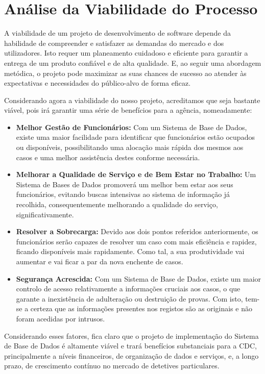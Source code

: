 \documentclass[a4paper,12pt]{scrreprt}
\begin{document}
    \section{Análise da Viabilidade do Processo}
        A viabilidade de um projeto de desenvolvimento de software depende da habilidade de compreender e satisfazer as
        demandas do mercado e dos utilizadores. Isto requer um planeamento cuidadoso e eficiente para garantir a
        entrega de um produto confiável e de alta qualidade. E, ao seguir uma abordagem metódica, o projeto pode
        maximizar as suas chances de sucesso ao atender às expectativas e necessidades do público-alvo de forma eficaz.
        \par Considerando agora a viabilidade do nosso projeto, acreditamos que seja bastante viável, pois irá garantir
        uma série de benefícios para a agência, nomeadamente:
        \begin{itemize}
            \item \textbf{Melhor Gestão de Funcionários:} Com um Sistema de Base de Dados, existe uma maior facilidade
                para identificar que funcionários estão ocupados ou disponíveis, possibilitando uma alocação mais
                rápida dos mesmos aos casos e uma melhor assistência destes conforme necessária.
            \item \textbf{Melhorar a Qualidade de Serviço e de Bem Estar no Trabalho:} Um Sistema de Bases de Dados
                promoverá um melhor bem estar aos seus funcionários, evitando buscas intensivas ao sistema de
                informação já recolhida, consequentemente melhorando a qualidade do serviço, significativamente.
            \item \textbf{Resolver a Sobrecarga:} Devido aos dois pontos referidos anteriormente, os funcionários
                serão capazes de resolver um caso com mais eficiência e rapidez, ficando disponíveis mais rapidamente.
                Como tal, a sua produtividade vai aumentar e vai ficar a par da nova enchente de casos.
            \item \textbf{Segurança Acrescida:} Com um Sistema de Base de Dados, existe um maior controlo de acesso
                relativamente a informações cruciais aos casos, o que garante a inexistência de adulteração ou
                destruição de provas. Com isto, tem-se a certeza que as informações presentes nos registos são as
                originais e não foram acedidas por intrusos.
        \end{itemize}
        \par Considerando esses fatores, fica claro que o projeto de implementação do Sistema de Base de Dados é
        altamente viável e trará benefícios substanciais para a CDC, principalmente a níveis financeiros, de
        organização de dados e serviços, e, a longo prazo, de crescimento contínuo no mercado de detetives particulares.
\end{document}
